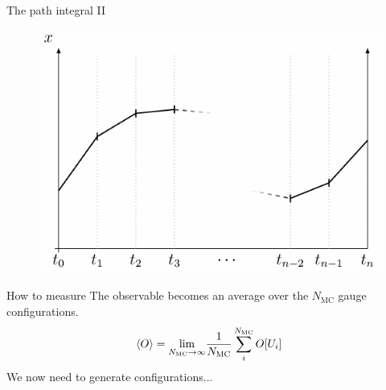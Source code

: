 \documentclass[10pt,show notes on second screen]{beamer}
\begin{document}
\begin{frame}{The path integral II}
\begin{figure}
    \centering
    \includegraphics[scale=1.0]{../figures/illustrations/lqcd/path-integral/path-integral-flattened}
\end{figure}
\end{frame}

\begin{frame}{How to measure}
The observable becomes an average over the $N_\mathrm{MC}$ gauge configurations.
\begin{align*}
    \left\langle{O}\right\rangle = \underset{N_\mathrm{MC}\rightarrow\infty}{\lim} \frac{1}{N_\mathrm{MC}} \sum^{N_\mathrm{MC}}_i O[U_i]
\end{align*}
We now need to generate configurations...
\end{frame}
\end{document}
